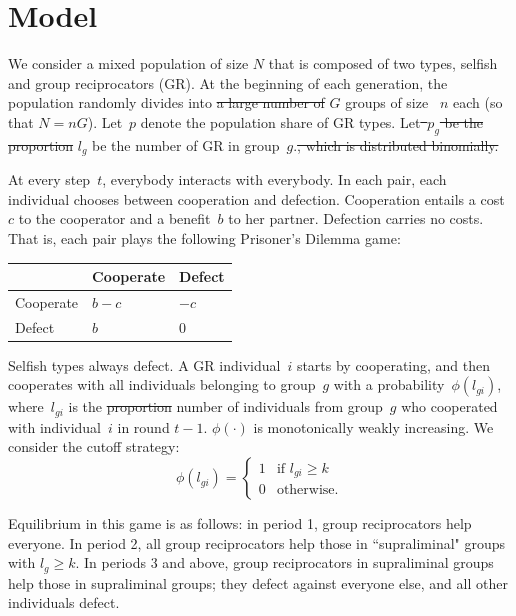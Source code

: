 \documentclass[12pt,a4paper]{article}
\newcommand{\mm}[1]{{\color{red} #1}}
\begin{document}
\section{Model}

We consider a mixed population of \mm{size $N$ that is composed of }two types, selfish and group reciprocators (GR). At the beginning of each generation, the population randomly divides into \sout{a large number of} \mm{$G$} groups of size~\mm{$n$} each \mm{(so that $N=nG$)}.
Let~$p$ denote the population share of GR types. 
Let\sout{~$p_g$ be the proportion} \mm{$l_g$ be the number} of GR in group~$g$.\sout{, which is distributed binomially.}

At every step~$t$, everybody interacts with everybody. In each pair, each individual chooses between cooperation and defection. Cooperation entails a cost~$c$ to the cooperator and a benefit~$b$ to her partner. Defection carries no costs. That is, each pair plays the following Prisoner's Dilemma game:
\begin{center}
    \begin{tabularx}{0.5\textwidth}{|x|x|x|}
        \hline
        &   Cooperate   &   Defect  \\
        \hline
        Cooperate   &   $b-c$   &   $-c$    \\
        \hline
        Defect  &   $b$ &   $0$   \\
        \hline
    \end{tabularx}
\end{center}

Selfish types always defect. A GR individual~$i$ starts by cooperating, and then cooperates with all individuals belonging to group~$g$ with a probability~$\phi(l_{gi})$, where~$l_{gi}$ is the \sout{proportion} \mm{number} of individuals from group~$g$ who cooperated with individual~$i$ in round $t-1$.
$\phi(\cdot)$ is monotonically weakly increasing. We consider the cutoff strategy: 
$$
    \phi(l_{gi}) =
    \begin{cases}
        1   &   \text{if } l_{gi} \geq k  \\
        0   &   \text{otherwise.}
    \end{cases}
$$

Equilibrium in this game is as follows: in period 1, group reciprocators help
everyone. In period 2, all group reciprocators help those in ``supraliminal"
groups with $l_g \geq k$. In periods 3 and above, group reciprocators in supraliminal
groups help those in supraliminal groups; they defect against everyone else,
and all other individuals defect.
\end{document}
